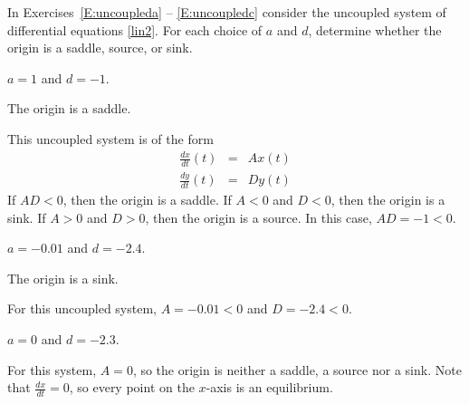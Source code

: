 \documentclass{ximera}
\begin{document}
\noindent In Exercises~\ref{E:uncoupleda} -- \ref{E:uncoupledc}
consider the uncoupled system of differential equations \eqref{lin2}.
For each choice of $a$ and $d$, determine whether the origin is a
saddle, source, or sink.
\begin{exercise} \label{E:uncoupleda}
$a=1$ and $d=-1$.

\begin{solution}

\ans The origin is a saddle.

\soln This uncoupled system is of the form
\[
\begin{array}{rcl}
\frac{dx}{dt}(t) & = & Ax(t) \\
\frac{dy}{dt}(t) & = & Dy(t)\end{array}
\]
If $AD < 0$, then the origin is a saddle.  If $A < 0$ and
$D < 0$, then the origin is a sink.  If $A > 0$ and $D > 0$, then
the origin is a source.  In this case, $AD = -1 < 0$.

\end{solution}
\end{exercise}
\begin{exercise} \label{E:uncoupledb}
$a=-0.01$ and $d=-2.4$.

\begin{solution}

\ans The origin is a sink.

\soln For this uncoupled system, $A = -0.01 < 0$ and $D = -2.4 < 0$.

\end{solution}
\end{exercise}
\begin{exercise} \label{E:uncoupledc}
$a=0$ and $d=-2.3$.

\begin{solution}
For this system, $A = 0$, so the origin is neither a
saddle, a source nor a sink.  Note that $\frac{dx}{dt} = 0$, so every
point on the $x$-axis is an equilibrium.

\end{solution}
\end{exercise}
\end{document}
